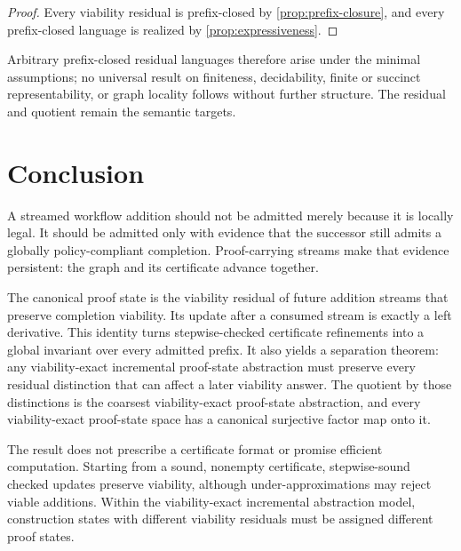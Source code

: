 \documentclass[11pt]{article}
\theoremstyle{definition}
\begin{document}
\begin{proof}
Every viability residual is prefix-closed by \cref{prop:prefix-closure}, and every prefix-closed language is realized by \cref{prop:expressiveness}.
\end{proof}

Arbitrary prefix-closed residual languages therefore arise under the minimal assumptions; no universal result on finiteness, decidability, finite or succinct representability, or graph locality follows without further structure. The residual and quotient remain the semantic targets.

\section{Conclusion}\label{sec:conclusion}

A streamed workflow addition should not be admitted merely because it is locally legal. It should be admitted only with evidence that the successor still admits a globally policy-compliant completion. Proof-carrying streams make that evidence persistent: the graph and its certificate advance together.

The canonical proof state is the viability residual of future addition streams that preserve completion viability. Its update after a consumed stream is exactly a left derivative. This identity turns stepwise-checked certificate refinements into a global invariant over every admitted prefix. It also yields a separation theorem: any viability-exact incremental proof-state abstraction must preserve every residual distinction that can affect a later viability answer. The quotient by those distinctions is the coarsest viability-exact proof-state abstraction, and every viability-exact proof-state space has a canonical surjective factor map onto it.

The result does not prescribe a certificate format or promise efficient computation. Starting from a sound, nonempty certificate, stepwise-sound checked updates preserve viability, although under-approximations may reject viable additions. Within the viability-exact incremental abstraction model, construction states with different viability residuals must be assigned different proof states.
\end{document}
